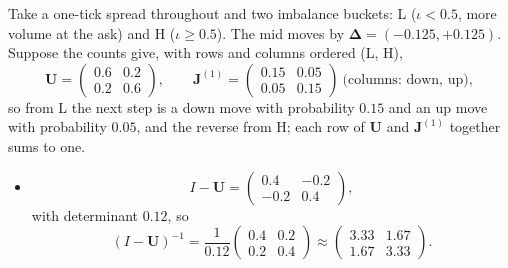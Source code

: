 \begin{example}
\label{ex:microprice-matrix}
Take a one-tick spread throughout and two imbalance buckets: L ($\iota < 0.5$, more volume at the ask)
and H ($\iota \ge 0.5$). The mid moves by $\boldsymbol{\Delta} = (-0.125, +0.125)$. Suppose the counts
give, with rows and columns ordered (L, H),
\[
  \mathbf{U} = \begin{pmatrix} 0.6 & 0.2 \\ 0.2 & 0.6 \end{pmatrix}, \qquad
  \mathbf{J}^{(1)} = \begin{pmatrix} 0.15 & 0.05 \\ 0.05 & 0.15 \end{pmatrix}
  \ \text{(columns: down, up)},
\]
so from L the next step is a down move with probability $0.15$ and an up move with probability $0.05$,
and the reverse from H; each row of $\mathbf{U}$ and $\mathbf{J}^{(1)}$ together sums to one.
\begin{itemize}[leftmargin=1.5em,itemsep=2pt]
\item 
\[
  I - \mathbf{U} = \begin{pmatrix} 0.4 & -0.2 \\ -0.2 & 0.4 \end{pmatrix},
\]
with determinant $0.12$,
  so 
\[
  (I - \mathbf{U})^{-1} = \frac{1}{0.12}\begin{pmatrix} 0.4 & 0.2 \\ 0.2 & 0.4 \end{pmatrix} \approx
  \begin{pmatrix} 3.33 & 1.67 \\ 1.67 & 3.33 \end{pmatrix}.
\]


\end{itemize}
\end{example}
